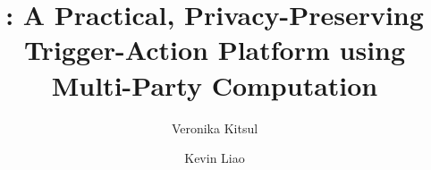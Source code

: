 \documentclass[sigplan,10pt]{acmart}
\begin{document}
\sloppy

\title{\sys: A Practical, Privacy-Preserving Trigger-Action Platform using Multi-Party Computation}

\author{Veronika Kitsul}
\email{}

\author{Kevin Liao}



\maketitle






















\end{document}
